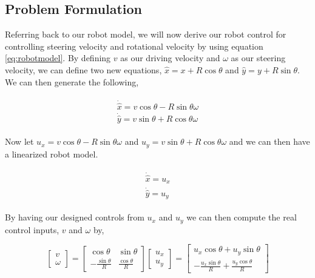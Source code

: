 \documentclass[12pt]{article}
\begin{document}

\subsection{Problem Formulation}\label{sec:formation}

Referring back to our robot model, we will now derive our robot control for controlling steering velocity and rotational velocity by using equation \ref{eq:robotmodel}.
By defining $v$ as our driving velocity and $\omega$ as our steering velocity, we can define two new equations, $\hat{x} = x + R\cos\theta$ and $\hat{y} = y + R\sin\theta$. We can then generate the following,

\begin{eqnarray}
	\begin{array}{ll}
		\dot{\hat{x}} = v\cos\theta - R \sin\theta \omega \\
		\dot{\hat{y}} = v\sin\theta + R \cos\theta \omega
	\end{array} \label{eq:xhatyhat}
\end{eqnarray}

Now let $u_x = v\cos\theta - R \sin\theta \omega$ and $u_y = v\sin\theta + R\cos\theta \omega$ and we can then have a linearized robot model.

\begin{eqnarray}
	\begin{array}{ll}
		\dot{\hat{x}} = u_x \\
		\dot{\hat{y}} = u_y
	\end{array} \label{eq:linear}
\end{eqnarray}

By having our designed controls from $u_x$ and $u_y$ we can then compute the real control inputs, $v$ and $\omega$ by,

\begin{equation}
 \left[\begin{array}{c} v \\ \omega \end{array}\right] = \left[\begin{matrix} \cos\theta & \sin\theta \\ -\frac{\sin\theta}{R} & \frac{\cos\theta}{R} \end{matrix}\right] \left[\begin{matrix} u_x \\ u_ y\end{matrix}\right]  = \left[ \begin{matrix} u_x\cos\theta + u_y\sin\theta \\ -\frac{u_x\sin\theta}{R}+ \frac{u_y\cos\theta}{R}  \end{matrix} \right] \label{eq:controlinput}
\end{equation}
\end{document}
